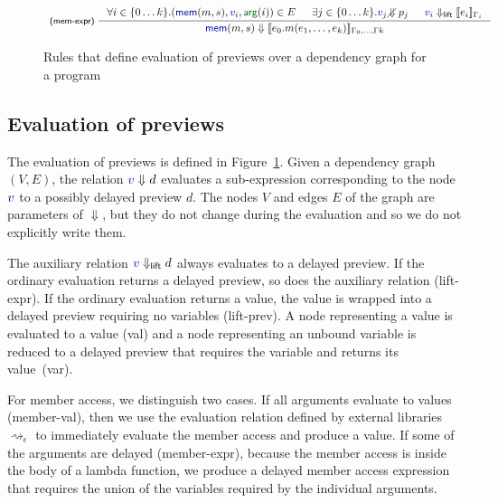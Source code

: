 \documentclass[english,submission]{programming}
\theoremstyle{plain}
\theoremstyle{definition}
\newcommand{\ident}[1]{\textnormal{\textcolor{idclr}{\sffamily #1}}}
\newcommand{\bndclr}[1]{\textcolor{kvdclr}{#1}}
\newcommand{\bnd}[1]{\textnormal{\textcolor{kvdclr}{\sffamily #1}}}
\newcommand{\blbl}[1]{\textnormal{\textcolor{numclr}{\sffamily #1}}}
\newcommand{\rname}[1]{{\sffamily(#1)}}
\begin{document}
\begin{figure}
\begin{equation*}
\begin{array}{l}
\inference[\rname{mem-expr}~]
  { \forall i\in\{0\ldots k\}.(\bnd{mem}(m, s), \bndclr{v_i}, \blbl{arg}(i)) \in E & \exists j\in\{0\ldots k\}.\bndclr{v_j}\diagup\hspace{-1em}\Downarrow p_j
   & \bndclr{v_i} \Downarrow_{\ident{lift}} \llbracket e_i \rrbracket_{\Gamma_i}  }
  { \bnd{mem}(m, s) \Downarrow \llbracket e_0.m(e_1, \ldots, e_k) \rrbracket_{\Gamma_0,\ldots,\Gamma k} }
\\
\end{array}
\end{equation*}
\vspace{-0.75em}
\caption{Rules that define evaluation of previews over a dependency graph for a program}
\label{fig:eval}
\vspace{-0.75em}
\end{figure}


\subsection{Evaluation of previews}
The evaluation of previews is defined in Figure~\ref{fig:eval}. Given a dependency graph $(V, E)$,
the relation $\bndclr{v}\Downarrow d$ evaluates a sub-expression corresponding to
the node $\bndclr{v}$ to a possibly delayed preview $d$. The nodes $V$ and edges $E$ of the
graph are parameters of $\Downarrow$, but they do not change during the
evaluation and so we do not explicitly write them.

The auxiliary relation $\bndclr{v}\Downarrow_{\ident{lift}} d$ always evaluates
to a delayed preview. If the ordinary evaluation returns a delayed preview, so does the auxiliary
relation \rname{lift-expr}. If the ordinary evaluation returns a value, the value is wrapped
into a delayed preview requiring no variables \rname{lift-prev}.
%
A node representing a value is evaluated to a value \rname{val} and a node representing
an unbound variable is reduced to a delayed preview that requires the variable and returns its
value~\rname{var}.

For member access, we distinguish two cases. If all arguments evaluate to values \rname{member-val},
then we use the evaluation relation defined by external libraries $\rightsquigarrow_\epsilon$ to
immediately evaluate the member access and produce a value. If some of the arguments are
delayed \rname{member-expr}, because the member access is inside the body of a lambda function,
we produce a delayed member access expression that requires the union of the variables
required by the individual arguments.
\end{document}
